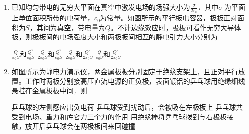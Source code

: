 \begin{enumerate}[leftmargin=0em]
\item
{}
已知均匀带电的无穷大平面在真空中激发电场的场强大小为$\frac { \sigma } { 2 \varepsilon _ { 0 } }$，其中$ \sigma $	为平面上单位面积所带的电荷量，$ \varepsilon _0 $为常量。如图所示的平行板电容器，极板正对面积为$ S $，其间为真空，带电量为$ Q $。不计边缘效应时，极板可看作无穷大导体板，则极板间的电场强度大小和两极板间相互的静电引力大小分别为  
\begin{figure}[h!]
\centering

\end{figure}
\fourchoices
{$\frac { Q } { \varepsilon _ { 0 } S } \text{和} \frac { Q ^ { 2 } } { \varepsilon _ { 0 } S }$}
{$\frac { Q } { 2 \varepsilon _ { 0 } S } \text{和} \frac { Q ^ { 2 } } { \varepsilon _ { 0 } S }$}
{$\frac { Q } { 2\varepsilon _ { 0 } S } \text{和} \frac { Q ^ { 2 } } { 2\varepsilon _ { 0 } S }$}
{$\frac { Q } { \varepsilon _ { 0 } S } \text{和} \frac { Q ^ { 2 } } { 2\varepsilon _ { 0 } S }$}



\item
{}
如图所示为静电力演示仪，两金属极板分别固定于绝缘支架上，且正对平行放置。工作时两板分别接高压直流电源的正负极，表面镀铝的乒乓球用绝缘细线悬挂在金属极板中间，则  
\begin{figure}[h!]
\centering

\end{figure}


\fourchoices
{乒乓球的左侧感应出负电荷}
{乒乓球受到扰动后，会被吸在左极板上}
{乒乓球共受到电场、重力和库仑力三个力的作用}
{用绝缘棒将乒乓球拨到与右极板接触，放开后乒乓球会在两极板间来回碰撞}








\end{enumerate}




